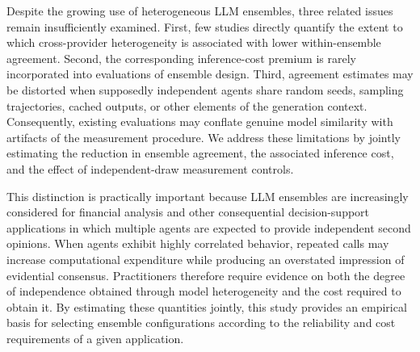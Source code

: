 \documentclass{ieeeaccess}
\begin{document}
Despite the growing use of heterogeneous LLM ensembles, three related issues
remain insufficiently examined. First, few studies directly quantify the extent
to which cross-provider heterogeneity is associated with lower within-ensemble
agreement. Second,
the corresponding inference-cost premium is rarely incorporated into evaluations
of ensemble design. Third, agreement estimates may be distorted when supposedly
independent agents share random seeds, sampling trajectories, cached outputs, or
other elements of the generation context. Consequently, existing evaluations may
conflate genuine model similarity with artifacts of the measurement procedure.
We address these limitations by jointly estimating the reduction in ensemble
agreement, the associated inference cost, and the effect of independent-draw
measurement controls.

This distinction is practically important because LLM ensembles are increasingly
considered for financial analysis and other consequential decision-support
applications in which multiple agents are expected to provide independent second
opinions. When agents exhibit highly correlated behavior, repeated calls may
increase computational expenditure while producing an overstated impression of
evidential consensus. Practitioners therefore require evidence on both the
degree of independence obtained through model heterogeneity and the cost
required to obtain it. By estimating these quantities jointly, this study
provides an empirical basis for selecting ensemble configurations according to
the reliability and cost requirements of a given application.
\end{document}
